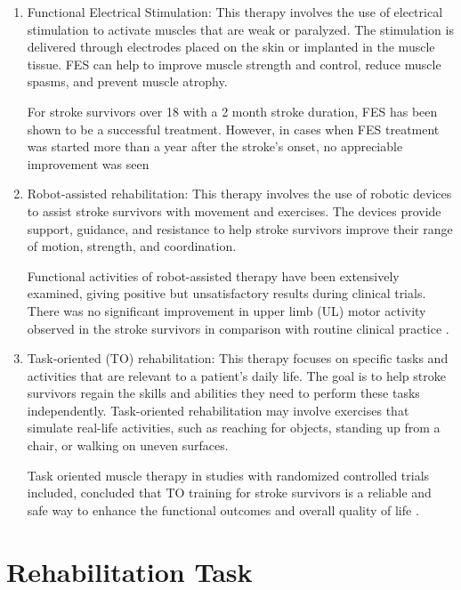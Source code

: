 \begin{enumerate}

    \item Functional Electrical Stimulation: This therapy involves the use of electrical stimulation to activate muscles that are weak or paralyzed. The stimulation is delivered through electrodes placed on the skin or implanted in the muscle tissue. FES can help to improve muscle strength and control, reduce muscle spasms, and prevent muscle atrophy. 

    For stroke survivors over 18 with a 2 month stroke duration, FES has been shown to be a successful treatment. However, in cases when FES treatment was started more than a year after the stroke's onset, no appreciable improvement was seen \cite{Alon2007}
    
    \item Robot-assisted rehabilitation: This therapy involves the use of robotic devices to assist stroke survivors with movement and exercises. The devices provide support, guidance, and resistance to help stroke survivors improve their range of motion, strength, and coordination.
    
    Functional activities of robot-assisted therapy have been extensively examined, giving positive but unsatisfactory results during clinical trials. There was no significant improvement in upper limb (UL) motor activity observed in the stroke survivors in comparison with routine clinical practice \cite{Masiero2014}.

    \item Task-oriented (TO) rehabilitation: This therapy focuses on specific tasks and activities that are relevant to a patient's daily life. The goal is to help stroke survivors regain the skills and abilities they need to perform these tasks independently. Task-oriented rehabilitation may involve exercises that simulate real-life activities, such as reaching for objects, standing up from a chair, or walking on uneven surfaces.

    Task oriented muscle therapy in studies with randomized controlled trials included, concluded that TO training for stroke survivors is a reliable and safe way to enhance the functional outcomes and overall quality of life \cite{Rensink2009}.


    
\end{enumerate}


\section{Rehabilitation Task} \label{rehabilitation_task}

